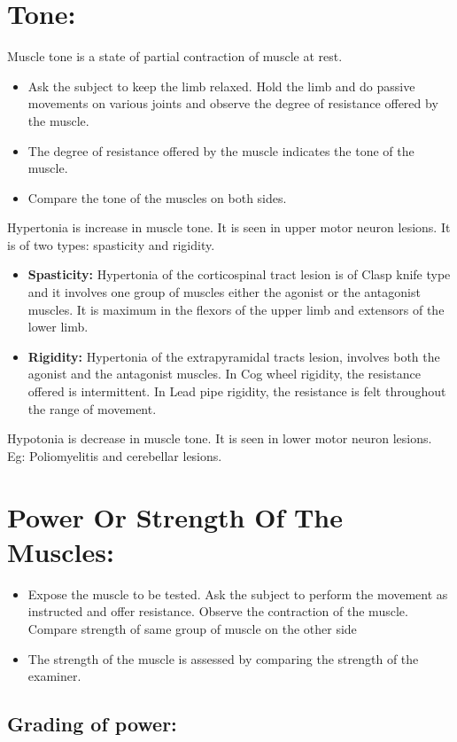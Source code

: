 \documentclass[a4paper,12pt,openany,twoside]{book}
\begin{document}
\section*{Tone:}
	Muscle tone is a state of partial contraction of muscle at rest.
	\begin{itemize}
			\itemsep0em
\item{Ask the subject to keep the limb relaxed. Hold the limb and do passive movements on various joints and observe the degree of resistance offered by the muscle.}
\item{The degree of resistance offered by the muscle indicates the tone of the muscle.}
\item{Compare the tone of the muscles on both sides.}
	\end{itemize}
	\par
	Hypertonia is increase in muscle tone. It is seen in upper motor neuron lesions. It is of two types: spasticity and rigidity.
	\begin{itemize}
			\itemsep0em
		\item{\textbf{Spasticity:} Hypertonia of the corticospinal tract lesion is of Clasp knife type and it involves one group of muscles either the agonist or the antagonist muscles. It is maximum in the flexors of the upper limb and extensors of the lower limb.}
		\item{\textbf{Rigidity:} Hypertonia of the extrapyramidal tracts lesion, involves both the agonist and the antagonist muscles. In Cog wheel rigidity, the resistance offered is intermittent. In Lead pipe rigidity, the resistance is felt throughout the range of movement.}
	\end{itemize}
	Hypotonia is decrease in muscle tone. It is seen in lower motor neuron lesions. Eg: Poliomyelitis and cerebellar lesions.
	\section*{Power Or Strength Of The Muscles:}
	\begin{itemize}
			\itemsep0em
\item{Expose the muscle to be tested. Ask the subject to perform the movement as instructed and offer resistance. Observe the contraction of the muscle. Compare strength of same group of muscle on the other side}
\item{The strength of the muscle is assessed by comparing the  strength of the examiner.}
	\end{itemize}
	\subsection*{Grading of power:}
\end{document}
